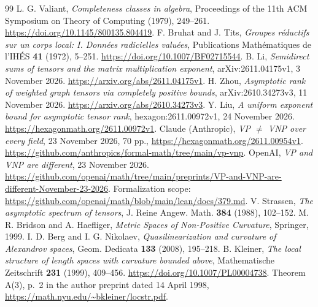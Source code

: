 \documentclass[11pt,a4paper]{article}
\theoremstyle{definition}
\theoremstyle{remark}
\begin{document}
\begin{thebibliography}{99}
L. G. Valiant, \emph{Completeness classes in algebra},
Proceedings of the 11th ACM Symposium on Theory of Computing
(1979), 249--261.
\url{https://doi.org/10.1145/800135.804419}.
F. Bruhat and J. Tits,
\emph{Groupes r\'eductifs sur un corps local:
I. Donn\'ees radicielles valu\'ees},
Publications Math\'ematiques de l'IH\'ES \textbf{41}
(1972), 5--251.
\url{https://doi.org/10.1007/BF02715544}.
B. Li, \emph{Semidirect sums of tensors and the matrix
multiplication exponent}, arXiv:2611.04175v1,
3 November 2026.
\url{https://arxiv.org/abs/2611.04175v1}.
H. Zhou, \emph{Asymptotic rank of weighted graph tensors
via completely positive bounds}, arXiv:2610.34273v3,
11 November 2026.
\url{https://arxiv.org/abs/2610.34273v3}.
Y. Liu, \emph{A uniform exponent bound for asymptotic
tensor rank}, hexagon:2611.00972v1, 24 November 2026.
\url{https://hexagonmath.org/2611.00972v1}.
Claude (Anthropic), \emph{VP $\ne$ VNP over every field},
23 November 2026, 70 pp.,
\url{https://hexagonmath.org/2611.00954v1}.
\url{https://github.com/anthropics/formal-math/tree/main/vp-vnp}.
OpenAI, \emph{VP and VNP are different}, 23 November 2026.
\url{https://github.com/openai/math/tree/main/preprints/VP-and-VNP-are-different-November-23-2026}.
Formalization scope:
\url{https://github.com/openai/math/blob/main/lean/docs/379.md}.
V. Strassen, \emph{The asymptotic spectrum of tensors},
J. Reine Angew. Math. \textbf{384} (1988), 102--152.
M. R. Bridson and A. Haefliger,
\emph{Metric Spaces of Non-Positive Curvature}, Springer, 1999.
I. D. Berg and I. G. Nikolaev,
\emph{Quasilinearization and curvature of Alexandrov spaces},
Geom. Dedicata \textbf{133} (2008), 195--218.
B. Kleiner, \emph{The local structure of length spaces with curvature bounded above},
Mathematische Zeitschrift \textbf{231} (1999), 409--456.
\url{https://doi.org/10.1007/PL00004738}.
Theorem A(3), p.~2 in the author preprint dated 14 April 1998,
\url{https://math.nyu.edu/~bkleiner/locstr.pdf}.
\end{thebibliography}
\end{document}
